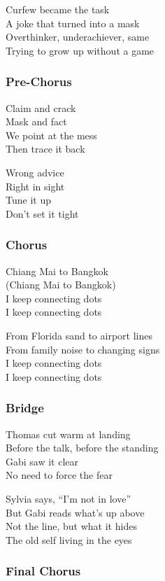 \documentclass[]{article}
\begin{document}
Curfew became the task\\
A joke that turned into a mask\\
Overthinker, underachiever, same\\
Trying to grow up without a game

\subsubsection{Pre-Chorus}\label{pre-chorus-60}

Claim and crack\\
Mask and fact\\
We point at the mess\\
Then trace it back

Wrong advice\\
Right in sight\\
Tune it up\\
Don't set it tight

\subsubsection{Chorus}\label{chorus-89}

Chiang Mai to Bangkok\\
(Chiang Mai to Bangkok)\\
I keep connecting dots\\
I keep connecting dots

From Florida sand to airport lines\\
From family noise to changing signs\\
I keep connecting dots\\
I keep connecting dots

\subsubsection{Bridge}\label{bridge-26}

Thomas cut warm at landing\\
Before the talk, before the standing\\
Gabi saw it clear\\
No need to force the fear

Sylvia says, ``I'm not in love''\\
But Gabi reads what's up above\\
Not the line, but what it hides\\
The old self living in the eyes

\subsubsection{Final Chorus}\label{final-chorus-6}
\end{document}
